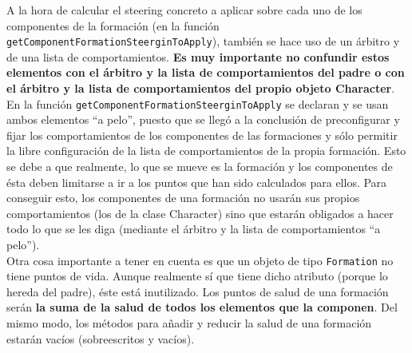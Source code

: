 A la hora de calcular el steering concreto a aplicar sobre cada uno de los componentes de la formación (en la función \texttt{getComponentFormationSteerginToApply}), también se hace uso de un árbitro y de una lista de comportamientos. \textbf{Es muy importante no confundir estos elementos con el árbitro y la lista de comportamientos del padre o con el árbitro y la lista de comportamientos del propio objeto Character}. En la función \texttt{getComponentFormationSteerginToApply} se declaran y se usan ambos elementos ``a pelo'', puesto que se llegó a la conclusión de preconfigurar y fijar los comportamientos de los componentes de las formaciones y sólo permitir la libre configuración de la lista de comportamientos de la propia formación. Esto se debe a que realmente, lo que se mueve es la formación y los componentes de ésta deben limitarse a ir a los puntos que han sido calculados para ellos. Para conseguir esto, los componentes de una formación no usarán sus propios comportamientos (los de la clase Character) sino que estarán obligados a hacer todo lo que se les diga (mediante el árbitro y la lista de comportamientos ``a pelo''). \\

Otra cosa importante a tener en cuenta es que un objeto de tipo \texttt{Formation} no tiene puntos de vida. Aunque realmente sí que tiene dicho atributo (porque lo hereda del padre), éste está inutilizado. Los puntos de salud de una formación serán \textbf{la suma de la salud de todos los elementos que la componen}. Del mismo modo, los métodos para añadir y reducir la salud de una formación estarán vacíos (sobreescritos y vacíos).

